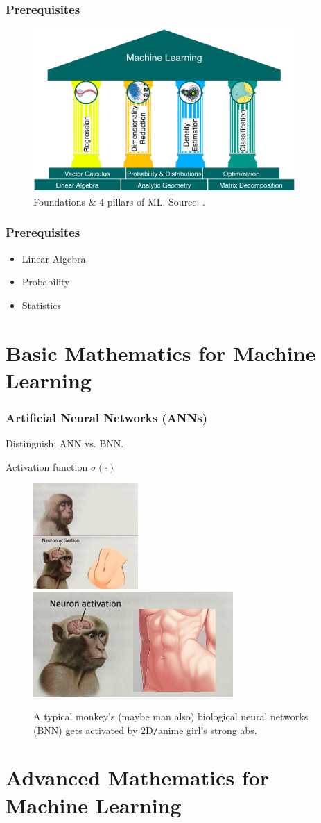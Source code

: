 \documentclass{beamer}
\begin{document}
\begin{frame}
	\frametitle{Prerequisites}
	\begin{figure}[H]
		\centering
		\includegraphics[width=10cm]{4_ML_pillars}
		\caption{Foundations \& 4 pillars of ML. Source: \cite[Fig. 1.1, p. 14]{Deisenroth_Faisal_Ong2023}.}
	\end{figure}
	
\end{frame}

\begin{frame}
	\frametitle{Prerequisites}
	\begin{itemize}
		\item Linear Algebra
		\item Probability
		\item Statistics
	\end{itemize}
\end{frame}

\section{Basic Mathematics for Machine Learning}

\begin{frame}
	\frametitle{Artificial Neural Networks (ANNs)}
	Distinguish: ANN vs. BNN.
	
	Activation function $\sigma(\cdot)$
	\begin{figure}[H]
		\includegraphics[height=4cm]{neuron_activation_anime}\includegraphics[height=4cm]{neuron_activation}
		\caption{A typical monkey's (maybe man also) biological neural networks (BNN) gets activated by 2D{\tt/}anime girl's strong abs.}
	\end{figure}
\end{frame}

\section{Advanced Mathematics for Machine Learning}
	
\end{document}
